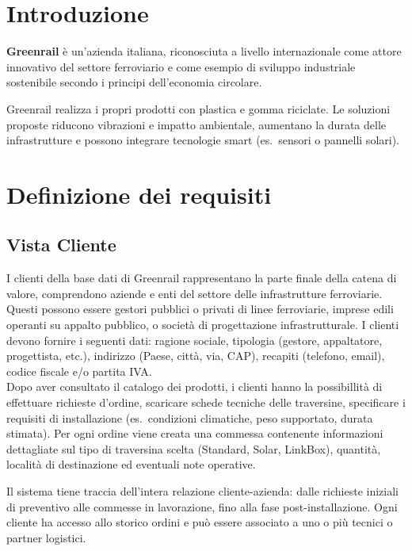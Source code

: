 \documentclass{article}
\begin{document}


\tableofcontents
\newpage

\section*{Introduzione}
\textbf{Greenrail\cite{Greenrail}} è un'azienda italiana, riconosciuta a livello internazionale come attore innovativo del settore ferroviario e come esempio di sviluppo industriale sostenibile secondo i principi dell'economia circolare.

\noindent Greenrail realizza i propri prodotti con plastica e gomma riciclate. Le soluzioni proposte riducono vibrazioni e impatto ambientale, aumentano la durata delle infrastrutture e possono integrare tecnologie smart (es.\ sensori o pannelli solari).

\section{Definizione dei requisiti}

\subsection{Vista Cliente}
I clienti della base dati di Greenrail rappresentano la parte finale della catena di valore, comprendono aziende e enti del settore delle infrastrutture ferroviarie. Questi possono essere gestori pubblici o privati di linee ferroviarie, imprese edili operanti su appalto pubblico, o società di progettazione infrastrutturale. I clienti devono fornire i seguenti dati: ragione sociale, tipologia (gestore, appaltatore, progettista, etc.), indirizzo (Paese, città, via, CAP), recapiti (telefono, email), codice fiscale e/o partita IVA.\\

\noindent Dopo aver consultato il catalogo dei prodotti, i clienti hanno la possibillità di effettuare richieste d’ordine, scaricare schede tecniche delle traversine, specificare i requisiti di installazione (es.\ condizioni climatiche, peso supportato, durata stimata). Per ogni ordine viene creata una commessa contenente informazioni dettagliate sul tipo di traversina scelta (Standard, Solar, LinkBox), quantità, località di destinazione ed eventuali note operative.

\noindent Il sistema tiene traccia dell'intera relazione cliente-azienda: dalle richieste iniziali di preventivo alle commesse in lavorazione, fino alla fase post-installazione. Ogni cliente ha accesso allo storico ordini e può essere associato a uno o più tecnici o partner logistici.
\end{document}
